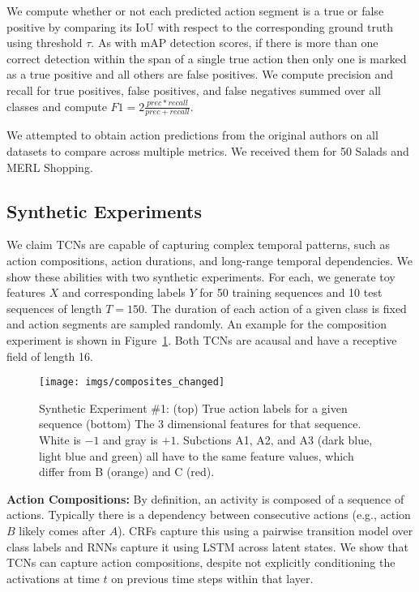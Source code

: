 \documentclass[10pt,twocolumn,letterpaper]{article}
\newcommand{\fakesubsection}[1]{\smallskip\noindent\textbf{#1:}}
\begin{document}
We compute whether or not each predicted action segment is a true or false positive by comparing its IoU with respect to the corresponding ground truth using threshold $\tau$. 
As with mAP detection scores, if there is more than one correct detection within the span of a single true action then only one is marked as a true positive and all others are false positives. We compute precision and recall for true positives, false positives, and false negatives summed over all classes and compute 
$F1=2\frac{prec*recall}{prec+recall}$. 


We attempted to obtain action predictions from the original authors on all datasets to compare across multiple metrics. We received them for 50 Salads and MERL Shopping.









\subsection{Synthetic Experiments}
We claim TCNs are capable of capturing complex temporal patterns, such as action compositions, action durations, and long-range temporal dependencies. We show these abilities with two synthetic experiments. 
For each, we generate toy features $X$ and corresponding labels $Y$ for 50 training sequences and 10 test sequences of length $T=150$. The duration of each action of a given class is fixed and action segments are sampled randomly. An example for the composition experiment is shown in Figure~\ref{fig:composites}.
Both TCNs are acausal and have a receptive field of length 16.


\begin{figure}
	\center
	\texttt{[image: imgs/composites\_changed]}
	\caption{Synthetic Experiment \#1: (top) True action labels for a given sequence (bottom) The 3 dimensional features for that sequence. White is $-1$ and gray is $+1$. Subctions A1, A2, and A3 (dark blue, light blue and green) all have to the same feature values, which differ from B (orange) and C (red).}
	\label{fig:composites}
\end{figure}

\fakesubsection{Action Compositions}
By definition, an activity is composed of a sequence of actions. Typically there is a dependency between consecutive actions (e.g., action $B$ likely comes after $A$).
CRFs capture this using a pairwise transition model over class labels and RNNs capture it using LSTM across latent states. 
We show that TCNs can capture action compositions, despite not explicitly conditioning the activations at time $t$ on previous time steps within that layer. 
\end{document}
